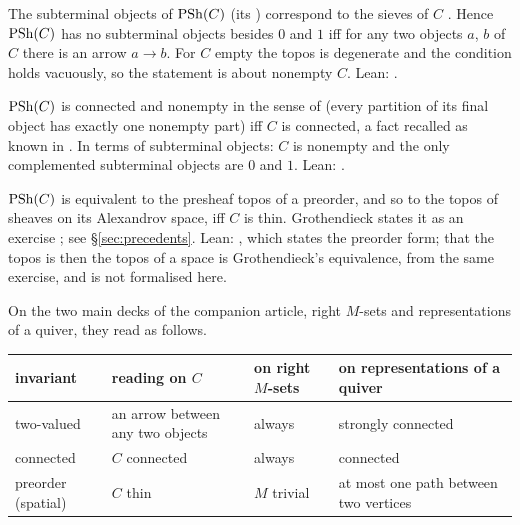 \begin{bridge}\label{br:twoval}
The subterminal objects of $\mathrm{PSh}(C)$ (its ) correspond to the sieves of $C$ \cite[IV~8.4.4]{sga4}. Hence $\mathrm{PSh}(C)$ has no subterminal objects besides $0$ and $1$ iff for any two objects $a$, $b$ of $C$ there is an arrow $a\to b$. For $C$ empty the topos is degenerate and the condition holds vacuously, so the statement is about nonempty $C$. Lean: .
\end{bridge}

\begin{bridge}[Connected]\label{br:conn}
$\mathrm{PSh}(C)$ is connected and nonempty in the sense of \cite[IV~8.7~e)]{sga4} (every partition of its final object has exactly one nonempty part) iff $C$ is connected, a fact recalled as known in \cite[Ex.~3.6]{hora-kamio}. In terms of subterminal objects: $C$ is nonempty and the only complemented subterminal objects are $0$ and $1$. Lean: .
\end{bridge}

\begin{bridge}[Spatial]\label{br:spatial}
$\mathrm{PSh}(C)$ is equivalent to the presheaf topos of a preorder, and so to the topos of sheaves on its Alexandrov space, iff $C$ is thin. Grothendieck states it as an exercise \cite[p.~26]{grothendieck-161-3}; see \S\ref{sec:precedents}. Lean: , which states the preorder form; that the topos is then the topos of a space is Grothendieck's equivalence, from the same exercise, and is not formalised here.
\end{bridge}

On the two main decks of the companion article, right $M$-sets and representations of a quiver, they read as follows.

\begin{center}\small
\begin{tabularx}{\linewidth}{>{\raggedright\arraybackslash}p{2.6cm}>{\raggedright\arraybackslash}p{3.2cm}>{\raggedright\arraybackslash}X>{\raggedright\arraybackslash}X}
\toprule
invariant & reading on $C$ & on right $M$-sets & on representations of a quiver\\
\midrule
two-valued & an arrow between any two objects & always & strongly connected\\
connected & $C$ connected & always & connected\\
preorder (spatial) & $C$ thin & $M$ trivial & at most one path between two vertices\\
\bottomrule
\end{tabularx}
\end{center}
